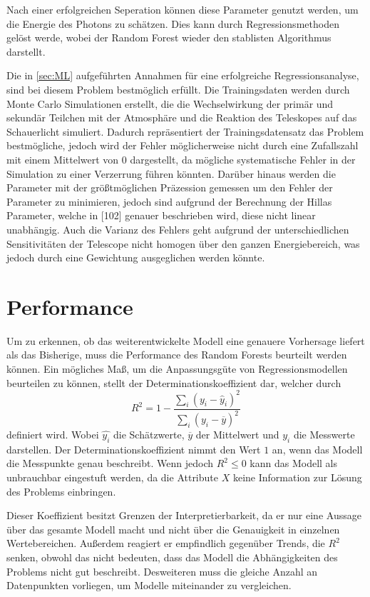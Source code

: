 Nach einer erfolgreichen Seperation können diese Parameter genutzt werden, um die Energie des Photons zu schätzen.
Dies kann durch Regressionsmethoden gelöst werde, wobei der Random Forest wieder den stablisten Algorithmus darstellt\cite{Cherenkov_Licht}.

Die in \autoref{sec:ML} aufgeführten Annahmen für eine erfolgreiche Regressionsanalyse, sind bei diesem Problem bestmöglich erfüllt. Die Trainingsdaten
werden durch Monte Carlo Simulationen erstellt, die die Wechselwirkung der primär und sekundär Teilchen mit der Atmosphäre und die Reaktion des Teleskopes
auf das Schauerlicht simuliert.
Dadurch repräsentiert der Trainingsdatensatz das Problem bestmögliche, jedoch wird der Fehler möglicherweise nicht durch eine Zufallszahl mit einem Mittelwert von $0$ dargestellt, da
mögliche systematische Fehler in der Simulation zu einer Verzerrung führen könnten.
Darüber hinaus werden die Parameter mit der größtmöglichen Präzession gemessen um den Fehler der Parameter zu minimieren,
jedoch sind aufgrund der Berechnung der Hillas Parameter, welche in [102]\cite{HESS}
genauer beschrieben wird, diese nicht linear unabhängig.
Auch die Varianz des Fehlers geht aufgrund der unterschiedlichen Sensitivitäten der Telescope nicht homogen
über den ganzen Energiebereich, was jedoch durch eine Gewichtung ausgeglichen werden könnte.

\section{Performance}

Um zu erkennen, ob das weiterentwickelte Modell eine genauere Vorhersage liefert als das Bisherige, muss die
Performance des Random Forests beurteilt werden können.
Ein mögliches Maß, um die Anpassungsgüte von Regressionsmodellen beurteilen zu können, stellt der Determinationskoeffizient dar, welcher
durch
\begin{equation}
  R^2 = 1 - \frac{\sum_i (y_i-\hat{y}_i)^2}{\sum_i (y_i - \overline{y})^2}
\end{equation}
definiert wird. Wobei $\hat{y_i}$ die Schätzwerte, $\overline{y}$ der Mittelwert und $y_i$ die Messwerte darstellen.
Der Determinationskoeffizient nimmt den Wert $1$ an, wenn das Modell die Messpunkte genau beschreibt. Wenn jedoch
$R^2 \leq 0$ kann das Modell als unbrauchbar eingestuft werden, da die Attribute $X$ keine Information zur
Lösung des Problems einbringen.

Dieser Koeffizient besitzt Grenzen der Interpretierbarkeit, da er nur eine Aussage über das gesamte Modell macht und
nicht über die Genauigkeit in einzelnen Wertebereichen.
Außerdem reagiert er empfindlich gegenüber Trends, die $R^2$ senken, obwohl das nicht bedeuten, dass das Modell die Abhängigkeiten des Problems
nicht gut beschreibt.
Desweiteren muss die gleiche Anzahl an Datenpunkten vorliegen, um Modelle
miteinander zu vergleichen.

